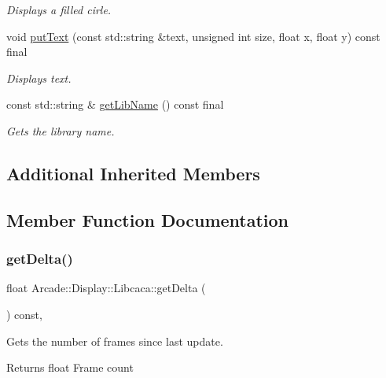 \begin{DoxyCompactItemize}
\begin{DoxyCompactList}\small\item\em Displays a filled cirle. \end{DoxyCompactList}\item 
void \mbox{\hyperlink{classArcade_1_1Display_1_1Libcaca_a2d4198dc8e383672ac00114d10b11e01}{put\+Text}} (const std\+::string \&text, unsigned int size, float x, float y) const final
\begin{DoxyCompactList}\small\item\em Displays text. \end{DoxyCompactList}\item 
const std\+::string \& \mbox{\hyperlink{classArcade_1_1Display_1_1Libcaca_a26e6dd02a853963fdcb812bddb3dee1e}{get\+Lib\+Name}} () const final
\begin{DoxyCompactList}\small\item\em Gets the library name. \end{DoxyCompactList}\end{DoxyCompactItemize}
\subsection*{Additional Inherited Members}


\subsection{Member Function Documentation}
\mbox{\label{classArcade_1_1Display_1_1Libcaca_a6aee007c10e66709680d1ec80f2662a4}} 
\subsubsection{\texorpdfstring{getDelta()}{getDelta()}}
{\footnotesize\ttfamily float Arcade\+::\+Display\+::\+Libcaca\+::get\+Delta (\begin{DoxyParamCaption}{ }\end{DoxyParamCaption}) const\hspace{0.3cm}{\ttfamily [final]}, {\ttfamily [virtual]}}



Gets the number of frames since last update. 

\begin{DoxyReturn}{Returns}
float Frame count 
\end{DoxyReturn}


